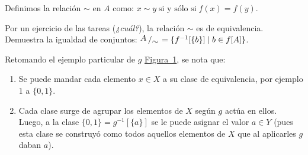 \documentclass[letterpaper,DIV=14,headsepline,12pt]{scrartcl}
\newcommand{\pts}{}
\newenvironment{ejercicio}[1]{\ifthenelse{\equal{#1}{1} \OR
\equal{#1}{+1}}{\renewcommand{\pts}{\textbf{(#1
pt)}}}{\renewcommand{\pts}{\textbf{(#1 pts)}}}\begin{ejj}\upshape
\pts}{\end{ejj}}
\newcommand{\quot}[2]{{\raisebox{.2em}{$#1$}\left/\raisebox{-.2em}{$#2$}\right.}}
\begin{document}
    \begin{definicion}
        Definimos la relación $\sim$ en $A$ como: $ x \sim y \; \text{si y sólo
        si} \; f(x)=f(y)$.
    \end{definicion}

    \begin{ejercicio}{1.5}\label{ej:rela} Por un ejercicio de las tareas
        (\textit{¿cuál?}), la relación $\sim$ es de equivalencia. Demuestra la
        igualdad de conjuntos: $\quot{A}{\sim}=\{ f^{-1}[\{b\}] \mid b \in f[A]
        \}$.
    \end{ejercicio}

    Retomando el ejemplo particular de $g$ \hyperref[fig:ejemplo]{Figura~1}, se
    nota que:
    \begin{enumerate}
        \item Se puede mandar cada elemento $x\in X$ a su clase de equivalencia,
        por ejemplo $1$ a $\{0,1\}$.
        \item Cada clase surge de agrupar los elementos de $X$ según $g$ actúa
        en ellos. Luego, a la clase $\{0,1\}=g^{-1}[\{a\}]$ se le puede asignar
        el valor $a \in Y$ (pues esta clase se construyó como todos aquellos
        elementos de $X$ que al aplicarles $g$ daban $a$).
    \end{enumerate}
\end{document}
